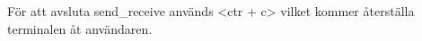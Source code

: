 För att avsluta send_receive används <ctr + c> vilket kommer återställa
terminalen åt användaren.

% 
% 
% 
% 
% 
% 
% 
